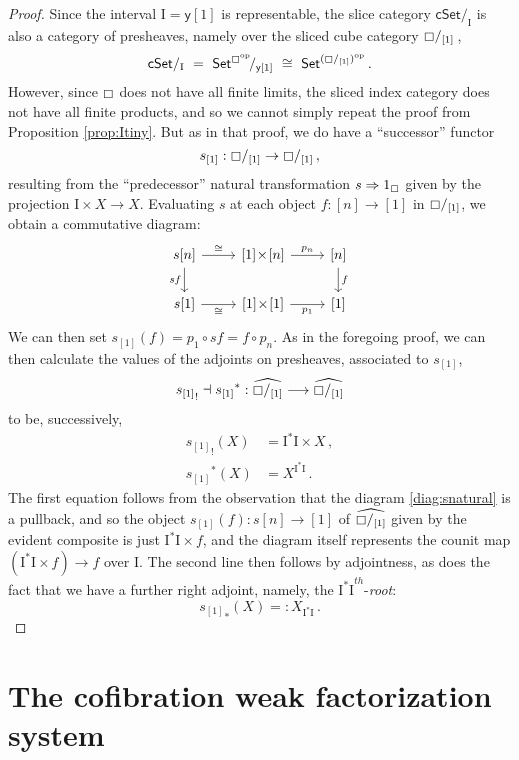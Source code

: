 \documentclass[11pt,reqno]{amsart}
\newcommand{\C}{\ensuremath{\boxempty}}
\newcommand{\psh}[1]{\ensuremath{\mathsf{Set}^{#1^{\mathrm{op}}}}}
\newcommand{\cSet}{\ensuremath{\mathsf{cSet}}}
\newcommand{\y}{\ensuremath{\mathsf{y}}} %
\renewcommand{\to}{\ensuremath{\rightarrow}}
\newcommand{\too}{\ensuremath{\longrightarrow}}
\newcommand{\I}{\ensuremath{\mathrm{I}}}
\theoremstyle{remark}
\theoremstyle{definition}
\begin{document}
\begin{proof}
Since the interval $\I = \y[1]$ is representable, the slice category $\cSet/_\I$ is also a category of presheaves, namely over the sliced cube category $\C/_{[1]}$\,,
\[
\cSet/_\I \ =\ {\psh{\C}}\!/_{\y[1]} \ \cong\ \psh{ (\C/_{[1]}) }\,.
\]
However, since $\C$ does not have all finite limits, the sliced index category does not have all finite products, and so we cannot simply repeat the proof from Proposition \ref{prop:Itiny}.  But as in that proof, we do have a ``successor'' functor 
\[
s_{[1]} : \C/_{[1]} \to \C/_{[1]}\,,
\]
resulting from the ``predecessor'' natural transformation $s \Rightarrow 1_\C$ given by the  projection $\I\times X \to X$. Evaluating $s$ at each object $f : [n] \to [1]$ in  $\C/_{[1]}$, we obtain a commutative diagram:
\begin{equation}\label{diag:snatural}
\begin{tikzcd}
s[n]  \ar[d,swap, "{sf}"] \ar[r, "{\cong}" ] & {[1]}\!\times\! {[n]}  \ar[r, "p_n"] & {[n]} \ar[d, "f"] \\  
s[1]  \ar[r, swap, "{\cong}" ] & {[1]}\!\times\! {[1]}  \ar[r, swap, "p_1"] & {[1]}
 \end{tikzcd}
 \end{equation}
We can then set $s_{[1]}(f) = p_1\circ sf = f\circ p_n$. As in the foregoing proof, we can then calculate the values of the adjoints on presheaves, associated to $s_{[1]}$,
 \[
 {s_{[1]}}_! \dashv {s_{[1]}}^* : \widehat{\C/_{[1]}} \too \widehat{\C/_{[1]}} \]
  to be, successively,
 \begin{align*}
 {s_{[1]}}_! (X) &= \I^*\I \times X\,, \\
  {s_{[1]}}^* (X) &= X^{\I^*\I} \,.
 \end{align*}
The first equation follows from the observation that the diagram \eqref{diag:snatural} is a pullback, and so the object $s_{[1]}(f)  : s[n]\to [1]$ of $\widehat{\C/_{[1]}}$ given by the evident composite is just $\I^*\I \times f $, and the diagram itself represents the counit map $(\I^*\I \times f) \to f$ over $\I$.
 The second line then follows by adjointness, as does the fact that we have a further right adjoint, namely, the ${\I^*\I}^{th}$-\emph{root}:
 \begin{equation*}
 {s_{[1]}}_* (X) =: X_{\I^*\I} \,.
 \end{equation*}
\end{proof}

\section{The cofibration weak factorization system}\label{sec:cofibrations}
%
%
\end{document}
